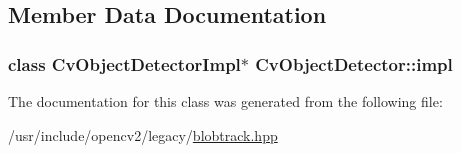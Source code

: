 \subsection{Member Data Documentation}
\hypertarget{classCvObjectDetector_a57854d8d18dfffbbceda386025aa150d}{
\subsubsection[{impl}]{\setlength{\rightskip}{0pt plus 5cm}class Cv\-Object\-Detector\-Impl$\ast$ Cv\-Object\-Detector\-::impl\hspace{0.3cm}{\ttfamily [protected]}}}\label{classCvObjectDetector_a57854d8d18dfffbbceda386025aa150d}


The documentation for this class was generated from the following file\-:\begin{DoxyCompactItemize}
\item 
/usr/include/opencv2/legacy/\hyperlink{blobtrack_8hpp}{blobtrack.\-hpp}\end{DoxyCompactItemize}
